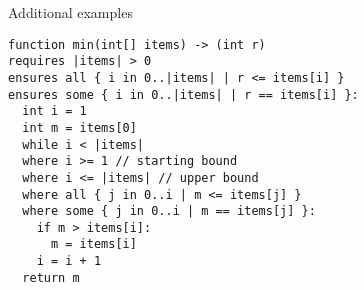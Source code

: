 \begin{frame}[fragile]{Additional examples}

\begin{verbatim}
function min(int[] items) -> (int r)
requires |items| > 0
ensures all { i in 0..|items| | r <= items[i] }
ensures some { i in 0..|items| | r == items[i] }:
  int i = 1
  int m = items[0]
  while i < |items|
  where i >= 1 // starting bound
  where i <= |items| // upper bound
  where all { j in 0..i | m <= items[j] }
  where some { j in 0..i | m == items[j] }:
    if m > items[i]:
      m = items[i]
    i = i + 1
  return m
\end{verbatim}


\end{frame}


